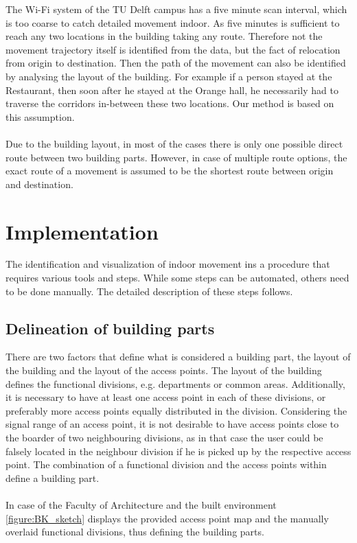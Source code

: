 The Wi-Fi system of the TU Delft campus has a five minute scan interval, which is too coarse to catch detailed movement indoor. As five minutes is
sufficient to reach any two locations in the building taking any route. Therefore not the movement trajectory itself is identified from the data, but
the fact of relocation from origin to destination. Then the path of the movement can also be identified by analysing the layout of the building. For example if a
person stayed at the Restaurant, then soon after he stayed at the Orange hall, he necessarily had to traverse the corridors in-between these two locations. Our method is based on this assumption.\\\\
Due to the building layout, in most of the cases there is only one possible direct route between two building parts. However, in case of multiple route
options, the exact route of a movement is assumed to be the shortest route between origin and destination.

\section{Implementation}
The identification and visualization of indoor movement ins a procedure that requires various tools and steps. While some steps can be automated, others need to be done manually. The detailed description of these steps follows.

\subsection{Delineation of building parts}
There are two factors that define what is considered a building part, the layout of the building and the layout of the access points. The layout of the
building defines the functional divisions, e.g. departments or common areas. Additionally, it is necessary to have at least one access point in each of these
divisions, or preferably more access points equally distributed in the division. Considering the signal range of an access point, it is not desirable to have
access points close to the boarder of two neighbouring divisions, as in that case the user could be falsely located in the neighbour division if he is picked
up by the respective access point. The combination of a functional division and the access points within define a building part.\\\\

In case of the Faculty of Architecture and the built environment \autoref{figure:BK_sketch} displays the provided access point map and the manually overlaid functional divisions, thus defining the building parts.

